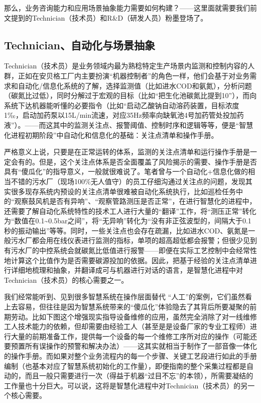 \documentclass[]{book}
\begin{document}
那么，业务咨询能力和应用场景抽象能力需要如何构建？------这里面就需要我们前文提到的Technician（技术员）和R\&D（研发人员）粉墨登场了。

\hypertarget{technicianux81eaux52a8ux5316ux4e0eux573aux666fux62bdux8c61}{%
\subsection{Technician、自动化与场景抽象}\label{technicianux81eaux52a8ux5316ux4e0eux573aux666fux62bdux8c61}}

Technician（技术员）是业务领域内最为熟稔特定生产场景内监测和控制内容的人群，正如在安贝格工厂内主要扮演``机器控制者''的角色一样，他们会基于对业务需求和自动化/信息化系统的了解，选择监测值（比如进水COD和氨氮），分析问题（碳氮比过低），同时分解过于宏观的目标（比如``把生化池碳氮比提到10''），而向系统下达机器能听懂的必要指令（比如``启动乙酸钠自动溶药装置，目标浓度1‰，启动加药泵以15L/min流速，对应35Hz频率向缺氧池4号加药管处投加药液''）。------而这其中的监测关注点、报警阈值、控制时序和逻辑等等，便是``智慧化进程初期阶段''中自动化和信息化的基础：关注点清单和操作手册。

严格意义上说，只要是在正常运转的体系，监测的关注点清单和运行操作手册是一定会有的。但是，这个关注点体系是否全面覆盖了风险揭示的需要、操作手册是否具有``傻瓜化''的指导意义，一般就很难说了。笔者曾与一个自动化+信息化做的相当不错的污水厂（现场100\%无人值守）的员工仔细沟通过关注点的问题，发现其实很多现存系统内预设的关注点清单很难被自动化系统执行，比如巡检任务中的``观察鼓风机是否有异响''、``观察管路测压是否正常''，在进行智慧化的进程中，还需要了解自动化系统特性的技术工人进行大量的``翻译''工作，将``测压正常''转化为``数值在0.1\textasciitilde{}0.5bar之间''，将``无异响''转化为``没有非正弦波型的，间隔大于0.1秒的振动输出''等等。同时，一些关注点也会存在疏漏，比如进水COD、氨氮是一般污水厂都会用在线仪表进行监测的指标，单项的超高超低都会报警；但很少见到有污水厂的中控系统会就碳氮比低值进行报警------即便在实际工艺控制中会经常性地计算这个比值作为是否需要碳源投加的依据。因此，把基于经验的关注点清单进行详细地梳理和抽象，并翻译成可与机器进行对话的语言，是智慧化进程中对Technician（技术员）的核心需要之一。

我们经常能听到、见到很多智慧系统在操作层面替代 ``人工''的案例，它们虽然看上去容易，但往往是因为智慧系统带来的``傻瓜化''体验隐去了其背后所要凝聚的前期劳动。比如下图这个增强现实指导设备维修的应用，虽然完全消除了对一线维修工人技术能力的依赖，但却需要由经验工人（甚至是是设备厂家的专业工程师）进行大量的前期准备工作，提供每一个设备的每一个维修工序所对应的操作（可能还要预置所有误操作的预警和解决办法）------这其实就相当于制作了一部音像一体化的操作手册。而如果对整个业务流程内的每一个步骤、关键工艺段进行如此的手册编制（也基本对应了智慧系统初始化的工作量），即便指南的整个采集过程都是自动的，而且一般只需要进行一次（得益于机器``过目不忘''的本领），所需要凝结的工作量也十分巨大。可以说，这将是智慧化进程中对Technician（技术员）的另一个核心需要。
\end{document}
